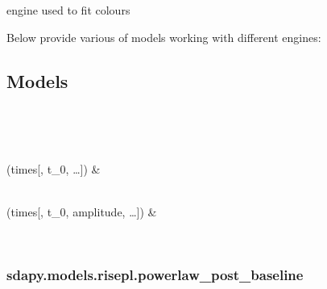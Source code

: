 \documentclass[letterpaper,10pt,english]{sphinxmanual}
\begin{document}
\begin{fulllineitems}
\label{\detokenize{generated/sdapy.engines.specv_evolution.engine:sdapy.engines.specv_evolution.engine}}
engine used to fit colours

\end{fulllineitems}


Below provide various of models working with different engines:


\subsection{Models}
\label{\detokenize{models:id1}}


\begin{savenotes}\sphinxatlongtablestart\begin{longtable}[c]{}
\hline

\endfirsthead

%
{}\\
\hline

\endhead

\hline
{}\\
\endfoot

\endlastfoot

{\hyperref[\detokenize{generated/sdapy.models.risepl.powerlaw_post_baseline:sdapy.models.risepl.powerlaw_post_baseline}]{}}(times{[}, t\_0, …{]})
&

\\
\hline
{\hyperref[\detokenize{generated/sdapy.models.risepl.powerlaw_full:sdapy.models.risepl.powerlaw_full}]{}}(times{[}, t\_0, amplitude, …{]})
&

\\
\hline
\end{longtable}\sphinxatlongtableend\end{savenotes}


\subsubsection{sdapy.models.risepl.powerlaw\_post\_baseline}
\label{\detokenize{generated/sdapy.models.risepl.powerlaw_post_baseline:sdapy-models-risepl-powerlaw-post-baseline}}\label{\detokenize{generated/sdapy.models.risepl.powerlaw_post_baseline::doc}}
\end{document}
